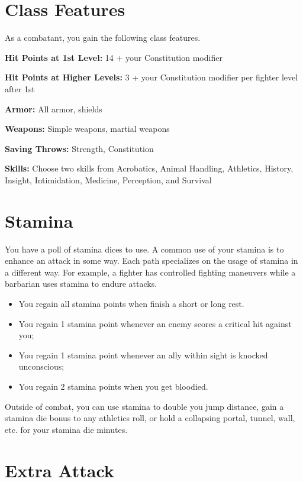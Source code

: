 \begin{multicols*}{2}

\section*{Class Features} 

As a combatant, you gain the following class features.

\textbf{
Hit Points at 1st Level:} 14 + your Constitution modifier

\textbf{Hit Points at Higher Levels:} 3 + your Constitution modifier per fighter level after 1st


\textbf{Armor:} All armor, shields

\textbf{Weapons:} Simple weapons, martial weapons

\textbf{Saving Throws:} Strength, Constitution

\textbf{Skills:} Choose two skills from Acrobatics, Animal Handling, Athletics, History, Insight, Intimidation, Medicine, Perception, and Survival 
    
\section*{Stamina} 

You have a poll of stamina dices to use. A common use of your stamina is to enhance an attack in some way. Each path specializes on the usage of stamina in a different way. For example, a fighter has controlled fighting maneuvers while a barbarian uses stamina to endure attacks.



\begin{itemize}
    \item You regain all stamina points when finish a short or long rest.
    \item You regain 1 stamina point whenever an enemy scores a critical hit against you;
    \item You regain 1 stamina point whenever an ally within sight is knocked unconscious;
    \item You regain 2 stamina points when you get bloodied.
\end{itemize}

Outside of combat, you can use stamina to double you jump distance, gain a stamina die bonus to any athletics roll, or hold a collapsing portal, tunnel, wall, etc. for your stamina die minutes.

   
\section*{Extra Attack} 


\end{multicols*}
